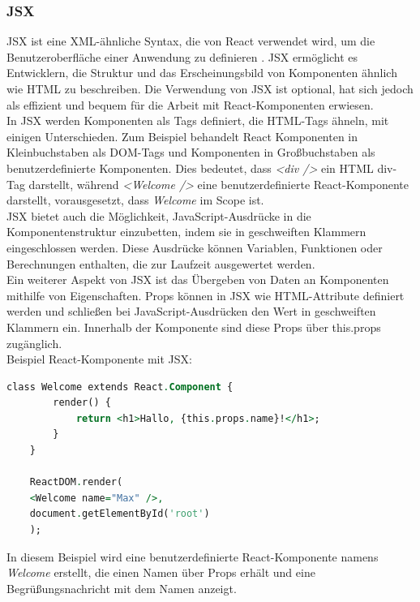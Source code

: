 \subsubsection{JSX}
JSX ist eine XML-ähnliche Syntax, die von React verwendet wird, um die Benutzeroberfläche einer Anwendung zu definieren \cite{deLegacyReactjs}. JSX ermöglicht es Entwicklern, die Struktur und das Erscheinungsbild von Komponenten ähnlich wie HTML zu beschreiben. Die Verwendung von JSX ist optional,  hat sich jedoch als effizient und bequem für die Arbeit mit React-Komponenten erwiesen.\\
In JSX werden Komponenten als Tags definiert, die HTML-Tags ähneln, mit einigen Unterschieden. Zum Beispiel behandelt React Komponenten in Kleinbuchstaben  als DOM-Tags und Komponenten in Großbuchstaben  als benutzerdefinierte Komponenten\cite{ReactComponentsAndProps}. Dies bedeutet, dass \emph{<div />} ein HTML div-Tag darstellt, während \emph{<Welcome />} eine benutzerdefinierte React-Komponente darstellt, vorausgesetzt, dass \emph{Welcome} im Scope ist.\\
JSX bietet auch die Möglichkeit, JavaScript-Ausdrücke in die Komponentenstruktur einzubetten, indem sie in geschweiften Klammern {} eingeschlossen werden. Diese Ausdrücke können Variablen, Funktionen oder Berechnungen enthalten, die zur Laufzeit ausgewertet werden.\\
Ein weiterer Aspekt von JSX ist das Übergeben von  Daten an Komponenten mithilfe von Eigenschaften. Props können in JSX  wie HTML-Attribute definiert werden und schließen bei JavaScript-Ausdrücken den Wert in geschweiften Klammern ein\cite{deLegacyReactjs}. Innerhalb der Komponente sind diese Props über this.props zugänglich.\\
Beispiel React-Komponente mit JSX: 

\begin{lstlisting}[language=vhdl,
	frame=single,           % Ein Rahmen um den Code
	framexleftmargin=15pt,  % Rahmen link von den Zahlen
	style=algoBericht,
	label={JSX},
	captionpos=b ,          % Caption unter den Code setzen
	caption={Beispiel JSX }]
class Welcome extends React.Component {
        render() {
        	return <h1>Hallo, {this.props.name}!</h1>;
        }
    }

    ReactDOM.render(
    <Welcome name="Max" />,
    document.getElementById('root')
    );
\end{lstlisting}
In diesem Beispiel wird eine benutzerdefinierte React-Komponente namens \emph{Welcome} erstellt, die einen Namen über Props erhält und eine Begrüßungsnachricht mit dem Namen anzeigt.

